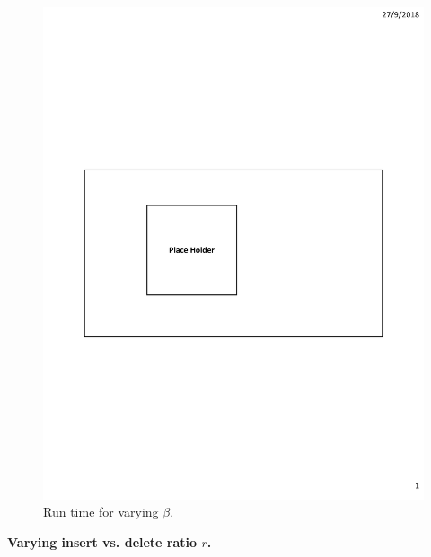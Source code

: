 \begin{figure}[h]
\begin{minipage}{0.18\linewidth}
		\includegraphics[width=\linewidth]{fig/PlaceHolder.pdf}
		\centerline{\dsrandom}
	\end{minipage}
	\caption{Run time for varying $\beta$.}
	\label{fig:vary-beta-time}
\end{figure}

\vspace{1mm}\noindent\textbf{Varying insert vs. delete ratio $r$.}

